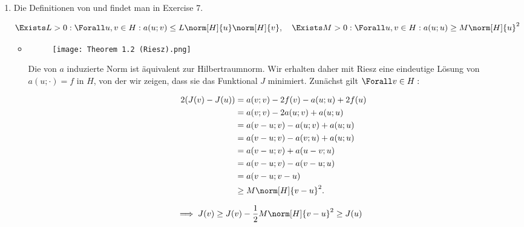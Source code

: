 \begin{solution}

\phantom{}

\begin{enumerate}[label = \textbf{\alph*)}]

  \item Die Definitionen von  und  findet man in Exercise 7.
  
  \begin{align*}
    \Exists L > 0:
    \Forall u, v \in H:
    a(u; v) \leq L \norm[H]{u} \norm[H]{v},
    \quad
    \Exists M > 0:
    \Forall u, v \in H:
    a(u; u) \geq M \norm[H]{u}^2
  \end{align*}

  \begin{itemize}

    \item
    [\Quote{$\implies$:}]

    \begin{figure}[h!]
      \centering
      \texttt{[image: Theorem 1.2 (Riesz).png]}
    \end{figure}

    Die von $a$ induzierte Norm ist äquivalent zur Hilbertraumnorm.
    Wir erhalten daher mit Riesz eine eindeutige Lösung von $a(u; \cdot) = f$ in $H$, von der wir zeigen, dass sie das Funktional $J$ minimiert.
    Zunächst gilt $\Forall v \in H:$

    \begin{align*}
      2 (J(v) - J(u))
      & =
      a(v; v) - 2f(v) - a(u; u) + 2 f(u) \\
      & =
      a(v; v) -2a(u; v) + a(u; u) \\
      & =
      a(v-u; v) - a(u; v) + a(u; u) \\
      & =
      a(v-u; v) - a(v; u) + a(u; u) \\
      & =
      a(v-u; v) + a(u-v; u) \\
      & =
      a(v-u; v) - a(v-u; u) \\
      & =
      a(v-u; v-u) \\
      & \geq
      M \norm[H]{v-u}^2.
    \end{align*}

    \begin{align*}
      \implies
      J(v)
      \geq
      J(v) - \frac{1}{2} M \norm[H]{v-u}^2
      & \geq
      J(u)
    \end{align*}


\end{itemize}
\end{enumerate}
\end{solution}
